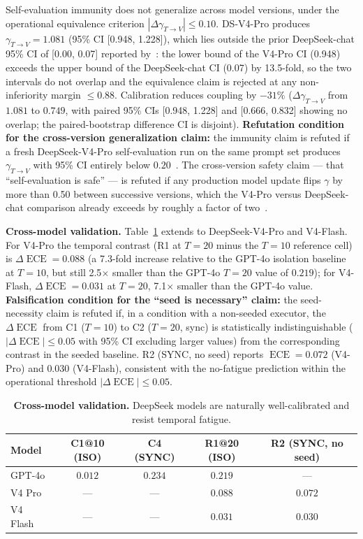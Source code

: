 \documentclass[11pt]{article}
\DeclareMathOperator{\ECE}{ECE}
\begin{document}
Self-evaluation immunity does not generalize across model versions, under the operational equivalence criterion $|\Delta\gamma_{T\to V}| \leq 0.10$. DS-V4-Pro produces $\gamma_{T \to V} = 1.081$ (95\% CI [0.948, 1.228]), which lies outside the prior DeepSeek-chat 95\% CI of [0.00, 0.07] reported by~\citet{liu2026epc}: the lower bound of the V4-Pro CI (0.948) exceeds the upper bound of the DeepSeek-chat CI (0.07) by 13.5-fold, so the two intervals do not overlap and the equivalence claim is rejected at any non-inferiority margin $\leq 0.88$. Calibration reduces coupling by $-31\%$ ($\Delta\gamma_{T\to V}$ from $1.081$ to $0.749$, with paired 95\% CIs [0.948, 1.228] and [0.666, 0.832] showing no overlap; the paired-bootstrap difference CI is disjoint). \textbf{Refutation condition for the cross-version generalization claim:} the immunity claim is refuted if a fresh DeepSeek-V4-Pro self-evaluation run on the same prompt set produces $\gamma_{T\to V}$ with 95\% CI entirely below $0.20$~\citep{liu2026epc,tian2023just}. The cross-version safety claim — that ``self-evaluation is safe'' — is refuted if any production model update flips $\gamma$ by more than 0.50 between successive versions, which the V4-Pro versus DeepSeek-chat comparison already exceeds by roughly a factor of two~\citep{sclar2024quantifying}.

\textbf{Cross-model validation.} Table~\ref{tab:cross} extends to DeepSeek-V4-Pro and V4-Flash. For V4-Pro the temporal contrast (R1 at $T{=}20$ minus the $T{=}10$ reference cell) is $\Delta\ECE = 0.088$ (a 7.3-fold increase relative to the GPT-4o isolation baseline at $T{=}10$, but still 2.5$\times$ smaller than the GPT-4o $T{=}20$ value of $0.219$); for V4-Flash, $\Delta\ECE = 0.031$ at $T{=}20$, 7.1$\times$ smaller than the GPT-4o value. \textbf{Falsification condition for the ``seed is necessary'' claim:} the seed-necessity claim is refuted if, in a condition with a non-seeded executor, the $\Delta\ECE$ from C1 ($T{=}10$) to C2 ($T{=}20$, sync) is statistically indistinguishable ($|\Delta\ECE| \leq 0.05$ with 95\% CI excluding larger values) from the corresponding contrast in the seeded baseline. R2 (SYNC, no seed) reports $\ECE = 0.072$ (V4-Pro) and $0.030$ (V4-Flash), consistent with the no-fatigue prediction within the operational threshold $|\Delta\ECE| \leq 0.05$.

\begin{table}[H]
\centering
\caption{\textbf{Cross-model validation.} DeepSeek models are naturally well-calibrated and resist temporal fatigue.}
\label{tab:cross}
\begin{tabular}{@{}lcccc@{}}
\toprule
Model & C1@10 (ISO) & C4 (SYNC) & R1@20 (ISO) & R2 (SYNC, no seed) \\
\midrule
GPT-4o & $0.012$ & $0.234$ & $0.219$ & --- \\
V4 Pro & --- & --- & $0.088$ & $0.072$ \\
V4 Flash & --- & --- & $0.031$ & $0.030$ \\
\bottomrule
\end{tabular}
\end{table}
\end{document}
